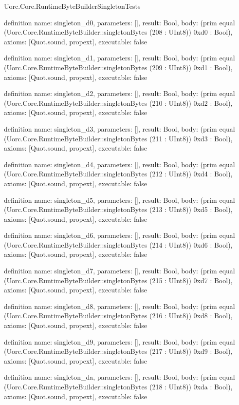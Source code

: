 \begin{lexlean}{Uorc.Core.RuntimeByteBuilderSingletonTests}
\begin{semanticmodule}
definition{
  name: singleton_d0,
  parameters: [],
  result: Bool,
  body: (prim equal (Uorc.Core.RuntimeByteBuilder::singletonBytes (208 : UInt8)) 0xd0 : Bool),
  axioms: [Quot.sound, propext],
  executable: false
}

definition{
  name: singleton_d1,
  parameters: [],
  result: Bool,
  body: (prim equal (Uorc.Core.RuntimeByteBuilder::singletonBytes (209 : UInt8)) 0xd1 : Bool),
  axioms: [Quot.sound, propext],
  executable: false
}

definition{
  name: singleton_d2,
  parameters: [],
  result: Bool,
  body: (prim equal (Uorc.Core.RuntimeByteBuilder::singletonBytes (210 : UInt8)) 0xd2 : Bool),
  axioms: [Quot.sound, propext],
  executable: false
}

definition{
  name: singleton_d3,
  parameters: [],
  result: Bool,
  body: (prim equal (Uorc.Core.RuntimeByteBuilder::singletonBytes (211 : UInt8)) 0xd3 : Bool),
  axioms: [Quot.sound, propext],
  executable: false
}

definition{
  name: singleton_d4,
  parameters: [],
  result: Bool,
  body: (prim equal (Uorc.Core.RuntimeByteBuilder::singletonBytes (212 : UInt8)) 0xd4 : Bool),
  axioms: [Quot.sound, propext],
  executable: false
}

definition{
  name: singleton_d5,
  parameters: [],
  result: Bool,
  body: (prim equal (Uorc.Core.RuntimeByteBuilder::singletonBytes (213 : UInt8)) 0xd5 : Bool),
  axioms: [Quot.sound, propext],
  executable: false
}

definition{
  name: singleton_d6,
  parameters: [],
  result: Bool,
  body: (prim equal (Uorc.Core.RuntimeByteBuilder::singletonBytes (214 : UInt8)) 0xd6 : Bool),
  axioms: [Quot.sound, propext],
  executable: false
}

definition{
  name: singleton_d7,
  parameters: [],
  result: Bool,
  body: (prim equal (Uorc.Core.RuntimeByteBuilder::singletonBytes (215 : UInt8)) 0xd7 : Bool),
  axioms: [Quot.sound, propext],
  executable: false
}

definition{
  name: singleton_d8,
  parameters: [],
  result: Bool,
  body: (prim equal (Uorc.Core.RuntimeByteBuilder::singletonBytes (216 : UInt8)) 0xd8 : Bool),
  axioms: [Quot.sound, propext],
  executable: false
}

definition{
  name: singleton_d9,
  parameters: [],
  result: Bool,
  body: (prim equal (Uorc.Core.RuntimeByteBuilder::singletonBytes (217 : UInt8)) 0xd9 : Bool),
  axioms: [Quot.sound, propext],
  executable: false
}

definition{
  name: singleton_da,
  parameters: [],
  result: Bool,
  body: (prim equal (Uorc.Core.RuntimeByteBuilder::singletonBytes (218 : UInt8)) 0xda : Bool),
  axioms: [Quot.sound, propext],
  executable: false
}


\end{semanticmodule}
\end{lexlean}
